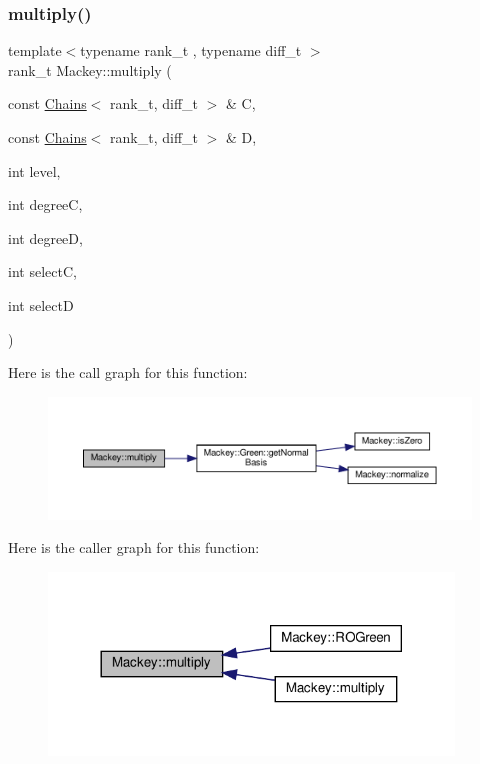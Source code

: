 \subsubsection{\texorpdfstring{multiply()}{multiply()}\hspace{0.1cm}{\footnotesize\ttfamily [1/2]}}
{\footnotesize\ttfamily template$<$typename rank\+\_\+t , typename diff\+\_\+t $>$ \\
rank\+\_\+t Mackey\+::multiply (\begin{DoxyParamCaption}\item[{const \hyperlink{classMackey_1_1Chains}{Chains}$<$ rank\+\_\+t, diff\+\_\+t $>$ \&}]{C,  }\item[{const \hyperlink{classMackey_1_1Chains}{Chains}$<$ rank\+\_\+t, diff\+\_\+t $>$ \&}]{D,  }\item[{int}]{level,  }\item[{int}]{degreeC,  }\item[{int}]{degreeD,  }\item[{int}]{selectC,  }\item[{int}]{selectD }\end{DoxyParamCaption})}

Here is the call graph for this function\+:\nopagebreak
\begin{figure}[H]
\begin{center}
\leavevmode
\includegraphics[width=350pt]{namespaceMackey_a80dbde3a859378ede596b48869ec50d9_cgraph}
\end{center}
\end{figure}
Here is the caller graph for this function\+:\nopagebreak
\begin{figure}[H]
\begin{center}
\leavevmode
\includegraphics[width=305pt]{namespaceMackey_a80dbde3a859378ede596b48869ec50d9_icgraph}
\end{center}
\end{figure}
\mbox{\label{namespaceMackey_a2eca4cc709501ad3fc20b82fe4bcbd33}} 
